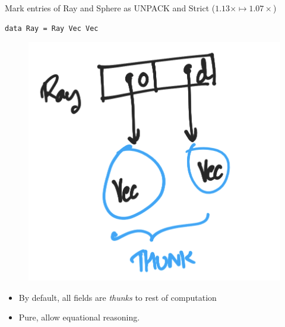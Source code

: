 \documentclass[8pt]{beamer}
\begin{document}
\begin{frame}[fragile]{Mark entries of Ray and Sphere as UNPACK and Strict ($1.13\times \mapsto 1.07\times$)}
\begin{verbatim}
data Ray = Ray Vec Vec 
\end{verbatim}

\begin{figure}
\includegraphics[height=0.4\textheight]{./ray-thunk.png}
\end{figure}

\begin{itemize}
\item By default, all fields are \emph{thunks} to rest of computation
\item Pure, allow equational reasoning.
\end{itemize}
\end{frame}
\end{document}

